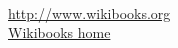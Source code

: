 \documentclass[letterpaper, 10pt]{article}
\begin{document}
\lipsum[1-4]
\citep{altschul1997gapped}\\
\url{http://www.wikibooks.org}\\
\href{http://www.wikibooks.org}{Wikibooks home}



\end{document}
